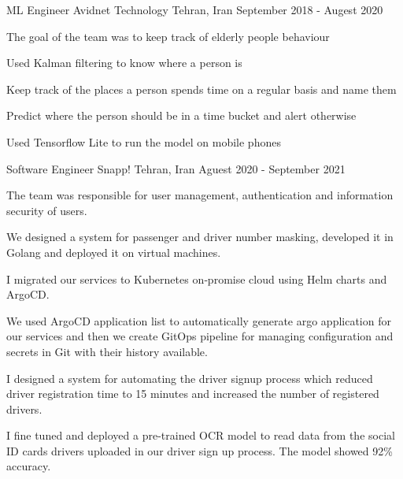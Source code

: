 
\begin{cventries}

  \cventry
    {ML Engineer} %
    {Avidnet Technology} %
    {Tehran, Iran} %
    {September 2018 - Augest 2020} %
    {
      \begin{cvitems}
        \item The goal of the team was to keep track of elderly people behaviour 
        \item Used Kalman filtering to know where a person is
        \item Keep track of the places a person spends time on a regular basis and name them
        \item Predict where the person should be in a time bucket and alert otherwise
        \item Used Tensorflow Lite to run the model on mobile phones
      \end{cvitems}
    }

  \cventry
    {Software Engineer} %
    {Snapp!} %
    {Tehran, Iran} %
    {Aguest 2020 - September 2021} %
    {
      \begin{cvitems} %
        \item The team was responsible for user management, authentication and information security of users.
        \item We designed a system for passenger and driver number masking, developed it in Golang and deployed it on virtual machines.
        \item I migrated our services to Kubernetes on‐promise cloud using Helm charts and ArgoCD.
        \item We used ArgoCD application list to automatically generate argo application for our services and then we create GitOps pipeline for managing configuration and secrets in Git with their history available.
        \item I designed a system for automating the driver signup process which reduced driver registration time to 15 minutes and increased the number of registered drivers.
        \item I fine tuned and deployed a pre-trained OCR model to read data from the social ID cards drivers uploaded in our driver sign up process. The model showed 92\% accuracy.
      \end{cvitems}
    }


\end{cventries}
